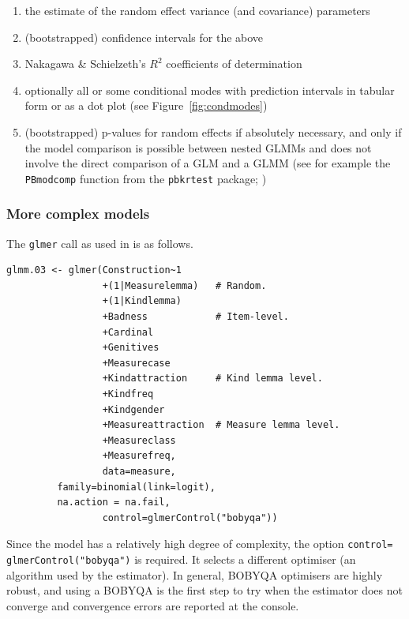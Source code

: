 \begin{enumerate}
  \item the estimate of the random effect variance (and covariance) parameters
  \item (bootstrapped) confidence intervals for the above
  \item Nakagawa \& Schielzeth's $R^2$ coefficients of determination
  \item optionally all or some conditional modes with prediction intervals in tabular form or as a dot plot (see Figure~\ref{fig:condmodes})
  \item (bootstrapped) p-values for random effects if absolutely necessary, and only if the model comparison is possible between nested GLMMs and does not involve the direct comparison of a GLM and a GLMM (see for example the \texttt{PBmodcomp} function from the \texttt{pbkrtest} package; \citealt{HalekohHojsgaard2014}) 
\end{enumerate}

\subsubsection{More complex models}

The \texttt{glmer} call as used in \citet{Schaefer2018} is as follows.

\vspace{0.5\baselineskip}

\begin{lstlisting}
glmm.03 <- glmer(Construction~1
                 +(1|Measurelemma)   # Random.
                 +(1|Kindlemma)
                 +Badness            # Item-level.
                 +Cardinal
                 +Genitives
                 +Measurecase
                 +Kindattraction     # Kind lemma level.
                 +Kindfreq
                 +Kindgender
                 +Measureattraction  # Measure lemma level.
                 +Measureclass
                 +Measurefreq,
                 data=measure,
		 family=binomial(link=logit),
		 na.action = na.fail,
                 control=glmerControl("bobyqa"))
\end{lstlisting}

Since the model has a relatively high degree of complexity, the option \texttt{control=} \texttt{glmerControl("bobyqa")} is required.
It selects a different optimiser (an algorithm used by the estimator).
In general, BOBYQA optimisers are highly robust, and using a BOBYQA is the first step to try when the estimator does not converge and convergence errors are reported at the console.

